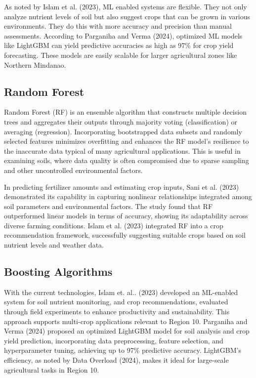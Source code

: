 {As noted by Islam et al. (2023), ML enabled systems are flexible. They not only analyze nutrient levels of soil but also suggest crops that can be grown in various environments. They do this with more accuracy and precision than manual assessments. According to Parganiha and Verma (2024), optimized ML models like LightGBM can yield predictive accuracies as high as 97\% for crop yield forecasting. These models are easily scalable for larger agricultural zones like Northern Mindanao.

\subsection{Random Forest}
Random Forest (RF) is an ensemble algorithm that constructs multiple decision trees and aggregates their outputs through majority voting (classification) or averaging (regression). Incorporating bootstrapped data subsets and randomly selected features minimizes overfitting and enhances the RF model’s resilience to the inaccurate data typical of many agricultural applications. This is useful in examining soils, where data quality is often compromised due to sparse sampling and other uncontrolled environmental factors.

In predicting fertilizer amounts and estimating crop inputs, Sani et al. (2023) demonstrated its capability in capturing nonlinear relationships integrated among soil parameters and environmental factors. The study found that RF outperformed linear models in terms of accuracy, showing its adaptability across diverse farming conditions. Islam et al. (2023) integrated RF into a crop recommendation framework, successfully suggesting suitable crops based on soil nutrient levels and weather data.

\subsection{Boosting Algorithms}

With the current technologies, Islam et. al.. (2023) developed an ML-enabled system for  soil nutrient monitoring, and crop recommendations, evaluated through field experiments to enhance productivity and sustainability. This approach supports multi-crop applications relevant to Region 10. Parganiha and Verma (2024) proposed an optimized LightGBM model for soil analysis and crop yield prediction, incorporating data preprocessing, feature selection, and hyperparameter tuning, achieving up to 97\% predictive accuracy. LightGBM’s efficiency, as noted by Data Overload (2024), makes it ideal for large-scale agricultural tasks in Region 10.

}

